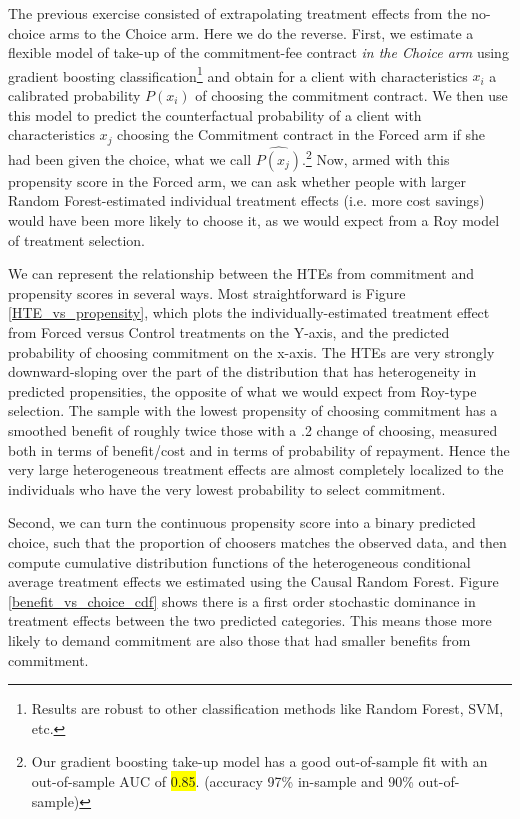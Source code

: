 \documentclass[oneside,11pt]{article}
\begin{document}
   
The previous exercise consisted of extrapolating treatment effects from the no-choice arms to the Choice arm. Here we do the reverse. First, we estimate a flexible model of take-up of the commitment-fee contract \textit{in the Choice arm} using gradient boosting classification\footnote{Results are robust to other classification methods like Random Forest, SVM, etc.} and obtain for a client with characteristics $x_i$ a calibrated probability $P(x_i)$ of choosing the commitment contract. We then use this model to predict the counterfactual probability of a client with characteristics $x_j$ choosing the Commitment contract in the Forced arm if she had been given the choice, what we call $\widehat{P(x_j)}$.\footnote{Our gradient boosting take-up model has a good out-of-sample fit with an out-of-sample AUC of \colorbox{yellow}{0.85}. (accuracy 97\% in-sample and 90\% out-of-sample)} Now, armed with this propensity score in the Forced arm, we can ask whether people with larger Random Forest-estimated individual treatment effects (i.e. more cost savings) would have been more likely to choose it, as we would expect from a Roy model of treatment selection. 



We can represent the relationship between the HTEs from commitment and propensity scores in several ways.  Most straightforward is Figure \ref{HTE_vs_propensity}, which plots the individually-estimated treatment effect from Forced versus Control treatments on the Y-axis, and the predicted probability of choosing commitment on the x-axis.  The HTEs are very strongly downward-sloping over the part of the distribution that has heterogeneity in predicted propensities, the opposite of what we would expect from Roy-type selection.  The sample with the lowest propensity of choosing commitment has a smoothed benefit of roughly twice those with a .2 change of choosing, measured both in terms of benefit/cost and in terms of probability of repayment.  Hence the very large heterogeneous treatment effects are almost completely localized to the individuals who have the very lowest probability to select commitment.


Second, we can turn the continuous propensity score into a binary predicted choice, such that the proportion of choosers matches the observed data, and then compute cumulative distribution functions of the heterogeneous conditional average treatment effects we estimated using the Causal Random Forest. Figure \ref{benefit_vs_choice_cdf} shows there is a first order stochastic dominance in treatment effects between the two predicted categories. This means those more likely to demand commitment are also those that had smaller benefits from commitment.
\end{document}
